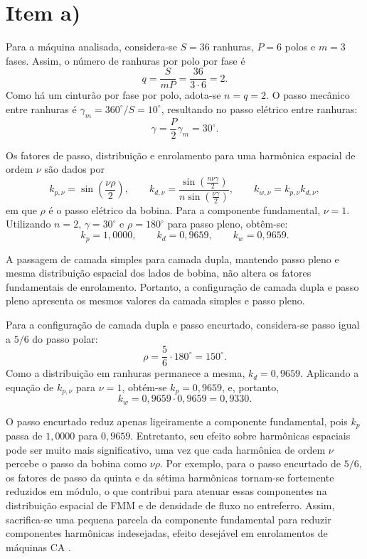 \section{Item a)}

Para a máquina analisada, considera-se \(S=36\) ranhuras, \(P=6\) polos e \(m=3\) fases. Assim, o número de ranhuras por polo por fase é
\[
q=\frac{S}{mP}=\frac{36}{3\cdot 6}=2.
\]
Como há um cinturão por fase por polo, adota-se \(n=q=2\). O passo mecânico entre ranhuras é \(\gamma_m=360^\circ/S=10^\circ\), resultando no passo elétrico entre ranhuras:
\[
\gamma=\frac{P}{2}\gamma_m=30^\circ.
\]

Os fatores de passo, distribuição e enrolamento para uma harmônica espacial de ordem \(\nu\) são dados por
\[
k_{p,\nu}=\sin\left(\frac{\nu\rho}{2}\right),
\qquad
k_{d,\nu}=
\frac{\sin\left(\frac{n\nu\gamma}{2}\right)}
{n\sin\left(\frac{\nu\gamma}{2}\right)},
\qquad
k_{w,\nu}=k_{p,\nu}k_{d,\nu},
\]
em que \(\rho\) é o passo elétrico da bobina. Para a componente fundamental, \(\nu=1\). Utilizando \(n=2\), \(\gamma=30^\circ\) e \(\rho=180^\circ\) para passo pleno, obtêm-se:
\[
k_p=1{,}0000,\qquad
k_d=0{,}9659,\qquad
k_w=0{,}9659.
\]

A passagem de camada simples para camada dupla, mantendo passo pleno e mesma distribuição espacial dos lados de bobina, não altera os fatores fundamentais de enrolamento. Portanto, a configuração de camada dupla e passo pleno apresenta os mesmos valores da camada simples e passo pleno.

Para a configuração de camada dupla e passo encurtado, considera-se passo igual a \(5/6\) do passo polar:
\[
\rho=\frac{5}{6}\cdot 180^\circ=150^\circ.
\]
Como a distribuição em ranhuras permanece a mesma, \(k_d=0{,}9659\). Aplicando a equação de \(k_{p,\nu}\) para \(\nu=1\), obtém-se \(k_p=0{,}9659\), e, portanto,
\[
k_w=0{,}9659\cdot 0{,}9659=0{,}9330.
\]

O passo encurtado reduz apenas ligeiramente a componente fundamental, pois \(k_p\) passa de \(1{,}0000\) para \(0{,}9659\). Entretanto, seu efeito sobre harmônicas espaciais pode ser muito mais significativo, uma vez que cada harmônica de ordem \(\nu\) percebe o passo da bobina como \(\nu\rho\). Por exemplo, para o passo encurtado de \(5/6\), os fatores de passo da quinta e da sétima harmônicas tornam-se fortemente reduzidos em módulo, o que contribui para atenuar essas componentes na distribuição espacial de FMM e de densidade de fluxo no entreferro. Assim, sacrifica-se uma pequena parcela da componente fundamental para reduzir componentes harmônicas indesejadas, efeito desejável em enrolamentos de máquinas CA \cite{FitzgeraldKingsleyUmans2014,Chapman2013MaquinasEletricas}.